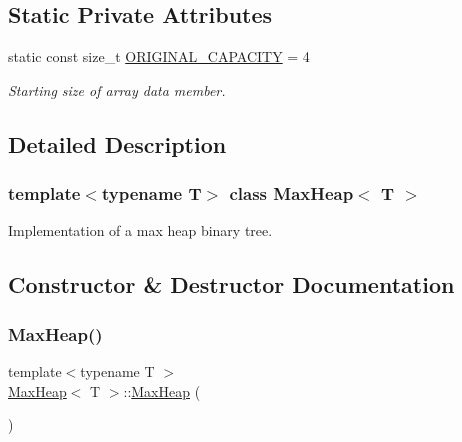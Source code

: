 \subsection*{Static Private Attributes}
\begin{DoxyCompactItemize}
\item 
\mbox{\label{class_max_heap_a123615251bd8fcd2e79e95cd5496f82c}} 
static const size\+\_\+t \hyperlink{class_max_heap_a123615251bd8fcd2e79e95cd5496f82c}{O\+R\+I\+G\+I\+N\+A\+L\+\_\+\+C\+A\+P\+A\+C\+I\+TY} = 4
\begin{DoxyCompactList}\small\item\em Starting size of array data member. \end{DoxyCompactList}\end{DoxyCompactItemize}


\subsection{Detailed Description}
\subsubsection*{template$<$typename T$>$\newline
class Max\+Heap$<$ T $>$}

Implementation of a max heap binary tree. 

\subsection{Constructor \& Destructor Documentation}
\mbox{\label{class_max_heap_a699765b3f302e72791fe0de91c36aa39}} 
\subsubsection{\texorpdfstring{Max\+Heap()}{MaxHeap()}\hspace{0.1cm}{\footnotesize\ttfamily [1/2]}}
{\footnotesize\ttfamily template$<$typename T $>$ \\
\hyperlink{class_max_heap}{Max\+Heap}$<$ T $>$\+::\hyperlink{class_max_heap}{Max\+Heap} (\begin{DoxyParamCaption}{ }\end{DoxyParamCaption})}



